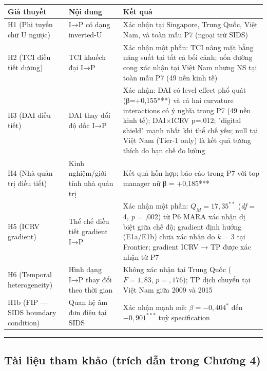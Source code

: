 \documentclass[12pt,a4paper]{article}
\begin{document}
\begin{longtable}[]{@{}lll@{}}
\toprule\noalign{}
Giả thuyết & Nội dung & Kết quả \\
\midrule\noalign{}
\endhead
\bottomrule\noalign{}
\endlastfoot
H1 (Phi tuyến chữ U ngược) & I→P có dạng inverted-U & Xác nhận tại
Singapore, Trung Quốc, Việt Nam, và toàn mẫu P7 (ngoại trừ SIDS) \\
H2 (TCI điều tiết dương) & TCI khuếch đại I→P & Xác nhận một phần: TCI
nâng mặt bằng năng suất tại tất cả bối cảnh; uốn đường cong xác nhận tại
Việt Nam nhưng NS tại toàn mẫu P7 (49 nền kinh tế) \\
H3 (DAI điều tiết) & DAI thay đổi độ dốc I→P & Xác nhận: DAI có level
effect phổ quát (β=+0,155***) và cả hai curvature interactions có ý
nghĩa trong P7 (49 nền kinh tế); DAI×ICRV p=.012; "digital shield" mạnh
nhất khi thể chế yếu; null tại Việt Nam (Tier-1 only) là kết quả tương
thích do hạn chế đo lường \\
H4 (Nhà quản trị điều tiết) & Kinh nghiệm/giới tính nhà quản trị & Kết
quả hỗn hợp; báo cáo trong P7 với top manager nữ β = +0,185*** \\
H5 (ICRV gradient) & Thể chế điều tiết gradient I→P & Xác nhận một phần:
\(Q_M = 17{,}35^{**}\) (\emph{df} = 4, \emph{p} = ,002) từ P6 MARA xác
nhận dị biệt giữa chế độ; gradient định hướng (E1a/E1b) chưa xác nhận do
\emph{k} = 3 tại Frontier; gradient ICRV → TP được xác nhận từ P7 \\
H6 (Temporal heterogeneity) & Hình dạng I→P thay đổi theo thời gian &
Không xác nhận tại Trung Quốc (\(F = 1{,}83\), \(p = {,}176\)); TP dịch
chuyển tại Việt Nam giữa 2009 và 2015 \\
H1b (FIP --- SIDS boundary condition) & Quan hệ âm đơn điệu tại SIDS &
Xác nhận mạnh mẽ: \(\beta = -0{,}404^{*}\) đến \(-0{,}901^{***}\) tuỳ
specification \\
\end{longtable}

\begin{center}\rule{0.5\linewidth}{0.5pt}\end{center}

\hypertarget{tuxe0i-liux1ec7u-tham-khux1ea3o-truxedch-dux1eabn-trong-chux1b0ux1a1ng-4}{%
\subsection{Tài liệu tham khảo (trích dẫn trong Chương
4)}\label{tuxe0i-liux1ec7u-tham-khux1ea3o-truxedch-dux1eabn-trong-chux1b0ux1a1ng-4}}
\end{document}
